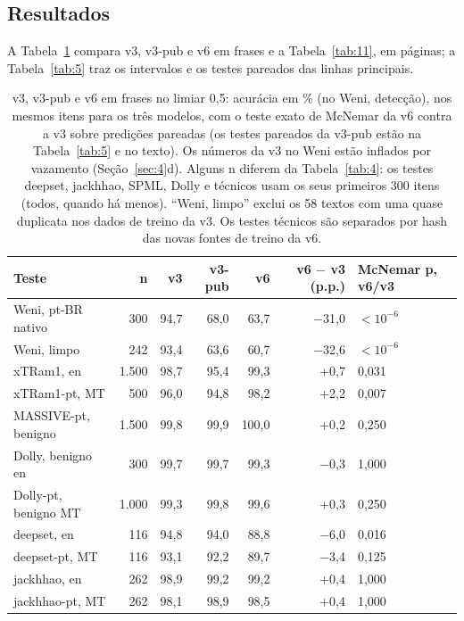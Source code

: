 \documentclass[11pt]{article}
\begin{document}
\subsection{Resultados}\label{sec:7.2}

A Tabela~\ref{tab:10} compara v3, v3-pub e v6 em frases e a Tabela~\ref{tab:11}, em páginas; a Tabela~\ref{tab:5} traz os intervalos e os testes pareados das linhas principais.

\begin{table}[tbp]
\centering
\small
\caption{v3, v3-pub e v6 em frases no limiar 0,5: acurácia em \% (no Weni, detecção), nos mesmos itens para os três modelos, com o teste exato de McNemar da v6 contra a v3 sobre predições pareadas (os testes pareados da v3-pub estão na Tabela~\ref{tab:5} e no texto). Os números da v3 no Weni estão inflados por vazamento (Seção~\ref{sec:4}d). Alguns n diferem da Tabela~\ref{tab:4}: os testes deepset, jackhhao, SPML, Dolly e técnicos usam os seus primeiros 300 itens (todos, quando há menos). ``Weni, limpo'' exclui os 58 textos com uma quase duplicata nos dados de treino da v3. Os testes técnicos são separados por hash das novas fontes de treino da v6.}\label{tab:10}
\begin{tabularx}{\linewidth}{@{}>{\raggedright\arraybackslash\hsize=1.00\hsize}Xrrrrrl@{}}
\toprule
Teste & n & v3 & v3-pub & v6 & v6 \ensuremath{-} v3 (p.p.) & McNemar p, v6/v3 \\
\midrule
Weni, pt-BR nativo & 300 & 94,7 & 68,0 & 63,7 & \ensuremath{-}31,0 & $<10^{-6}$ \\
Weni, limpo & 242 & 93,4 & 63,6 & 60,7 & \ensuremath{-}32,6 & $<10^{-6}$ %
 \\
xTRam1, en & 1.500 & 98,7 & 95,4 & 99,3 & +0,7 & 0,031 \\
xTRam1-pt, MT & 500 & 96,0 & 94,8 & 98,2 & +2,2 & 0,007 \\
MASSIVE-pt, benigno & 1.500 & 99,8 & 99,9 & 100,0 & +0,2 & 0,250 \\
Dolly, benigno en & 300 & 99,7 & 99,7 & 99,3 & \ensuremath{-}0,3 & 1,000 \\
Dolly-pt, benigno MT & 1.000 & 99,3 & 99,8 & 99,6 & +0,3 & 0,250 \\
deepset, en & 116 & 94,8 & 94,0 & 88,8 & \ensuremath{-}6,0 & 0,016 \\
deepset-pt, MT & 116 & 93,1 & 92,2 & 89,7 & \ensuremath{-}3,4 & 0,125 \\
jackhhao, en & 262 & 98,9 & 99,2 & 99,2 & +0,4 & 1,000 \\
jackhhao-pt, MT & 262 & 98,1 & 98,9 & 98,5 & +0,4 & 1,000 \\

\end{tabularx}
\end{table}
\end{document}
